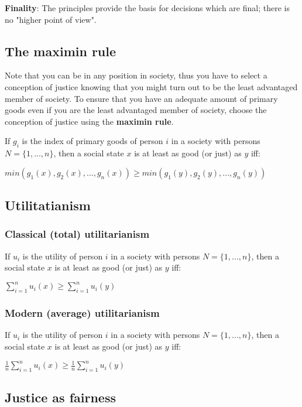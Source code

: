 \textbf{Finality}: The principles provide the basis for decisions which are
final; there is no "higher point of view".

\subsection{The maximin rule}

Note that you can be in any position in society, thus you have to select a
conception of justice knowing that you might turn out to be the least
advantaged member of society. To ensure that you have an adequate amount of
primary goods even if you are the least advantaged member of society, choose
the conception of justice using the \textbf{maximin rule}.

If $g_i$ is the index of primary goods of person $i$ in a society with persons
$N = \{1, ..., n\}$, then a social state $x$ is at least as good (or just)
as $y$ iff:

$min(g_1(x), g_2(x), ..., g_n(x)) \geq min(g_1(y), g_2(y), ..., g_n(y))$

\subsection{Utilitatianism}

\subsubsection{Classical (total) utilitarianism}

If $u_i$ is the utility of person $i$ in a society with persons
$N = \{1, ..., n\}$, then a social state $x$ is at least as good (or just) as
$y$ iff:

$\sum_{i=1}^{n} u_i(x) \geq \sum_{i=1}^{n} u_i(y)$

\subsubsection{Modern (average) utilitarianism}

If $u_i$ is the utility of person $i$ in a society with persons
$N = \{1, ..., n\}$, then a social state $x$ is at least as good (or just) as
$y$ iff:

$\frac{1}{n} \sum_{i=1}^{n} u_i(x) \geq \frac{1}{n} \sum_{i=1}^{n} u_i(y)$

\subsection{Justice as fairness}

